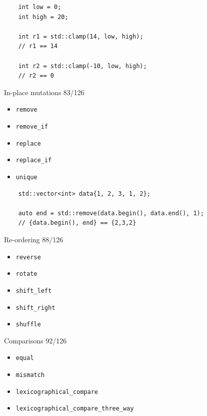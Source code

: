 \documentclass[aspectratio=169]{beamer}
\begin{document}
\begin{frame}[fragile]{}
  \begin{verbatim}
    int low = 0;
    int high = 20;
    
    int r1 = std::clamp(14, low, high);
    // r1 == 14

    int r2 = std::clamp(-10, low, high);
    // r2 == 0
  \end{verbatim}
\end{frame}

\begin{frame}{In-place mutations 83/126}
  \begin{itemize}
    \item{\texttt{remove}}
    \item{\texttt{remove_if}}
    \item{\texttt{replace}}
    \item{\texttt{replace_if}}
    \item{\texttt{unique}}
  \end{itemize}
\end{frame}

\begin{frame}[fragile]{}
  \begin{verbatim}
    std::vector<int> data{1, 2, 3, 1, 2};

    auto end = std::remove(data.begin(), data.end(), 1);
    // {data.begin(), end} == {2,3,2}
  \end{verbatim}
\end{frame}

\begin{frame}{Re-ordering 88/126}
  \begin{itemize}
    \item{\texttt{reverse}}
    \item{\texttt{rotate}}
    \item{\texttt{shift_left}}
    \item{\texttt{shift_right}}
    \item{\texttt{shuffle}}
  \end{itemize}
\end{frame}

\begin{frame}{Comparisons 92/126}
  \begin{itemize}
    \item{\texttt{equal}}
    \item{\texttt{mismatch}}
    \item{\texttt{lexicographical_compare}}
    \item{\texttt{lexicographical_compare_three_way}}
  \end{itemize}
\end{frame}
\end{document}
